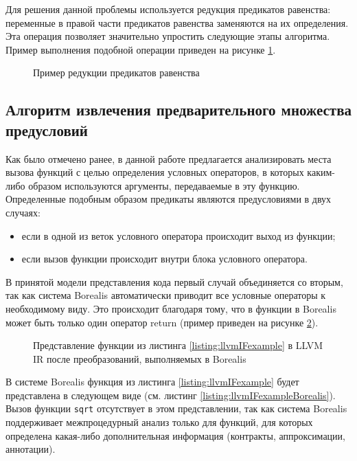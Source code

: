 Для решения данной проблемы используется редукция предикатов равенства: переменные в правой части предикатов равенства заменяются на их определения. Эта операция позволяет значительно упростить следующие этапы алгоритма. Пример выполнения подобной операции приведен на рисунке \ref{image:equalityMapperExample}.
\begin{figure}[h!]
\caption{Пример редукции предикатов равенства}
\label{image:equalityMapperExample}
\end{figure}

\subsection{Алгоритм извлечения предварительного множества предусловий}
\label{subsection:extraction}
Как было отмечено ранее, в данной работе предлагается анализировать места вызова функций с целью определения условных операторов, в которых каким-либо образом используются аргументы, передаваемые в эту функцию. Определенные подобным образом предикаты являются предусловиями в двух случаях:
\begin{itemize}
\item если в одной из веток условного оператора происходит выход из функции;
\item если вызов функции происходит внутри блока условного оператора.
\end{itemize}

В принятой модели представления кода первый случай объединяется со вторым, так как система Borealis автоматически приводит все условные операторы к необходимому виду. Это происходит благодаря тому, что в функции в Borealis может быть только один оператор return (пример приведен на рисунке \ref{image:llvmIFcfg}).

 	
\begin{figure}[h!]
\caption{Представление функции из листинга \ref{listing:llvmIFexample} в LLVM IR после преобразований, выполняемых в Borealis}
\label{image:llvmIFcfg}
\end{figure}

В системе Borealis функция из листинга \ref{listing:llvmIFexample} будет представлена в следующем виде (см. листинг \ref{listing:llvmIFexampleBorealis}). Вызов функции \texttt{sqrt} отсутствует в этом представлении, так как система Borealis поддерживает межпроцедурный анализ только для функций, для которых определена какая-либо дополнительная информация (контракты, аппроксимации, аннотации).


